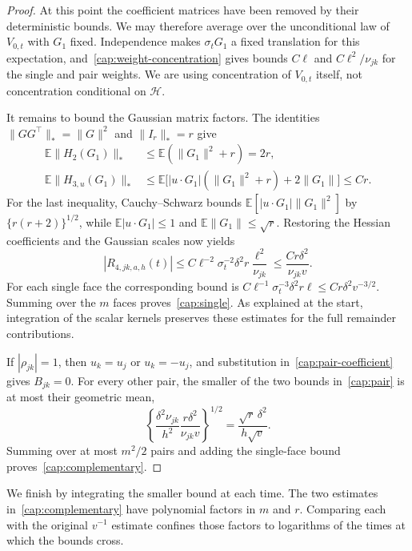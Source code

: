\documentclass[11pt,letterpaper]{article}
\theoremstyle{remark}
\newcommand{\E}{\mathbb E}
\begin{document}
\begin{proof}
At this point the coefficient matrices have been removed by
their deterministic bounds. We may therefore average over
the unconditional law of $V_{0,t}$ with $G_1$ fixed.
Independence makes $\sigma_tG_1$ a fixed translation for this
expectation, and~\eqref{cap:weight-concentration} gives bounds
$C\ell$ and $C\ell^2/\nu_{jk}$ for the single and pair
weights. We are using concentration of $V_{0,t}$ itself,
not concentration conditional on $\mathcal H$.

It remains to bound the Gaussian matrix factors. The identities
$\|GG^\top\|_*=\|G\|^2$ and $\|I_r\|_*=r$ give
\[
 \begin{aligned}
 \E\|H_2(G_1)\|_*&\le\E(\|G_1\|^2+r)=2r,\\
 \E\|H_{3,u}(G_1)\|_*
 &\le\E\bigl[|u\cdot G_1|(\|G_1\|^2+r)
                                      +2\|G_1\|\bigr]\le Cr.
 \end{aligned}
\]
For the last inequality, Cauchy--Schwarz bounds
$\E[|u\cdot G_1|\|G_1\|^2]$ by
$\{r(r+2)\}^{1/2}$, while
$\E|u\cdot G_1|\le1$ and $\E\|G_1\|\le\sqrt r$.
Restoring the Hessian coefficients and the Gaussian scales now
yields
\[
 |R_{4,jk,a,h}(t)|
 \le C\ell^{-2}\sigma_t^{-2}\delta^2r
                    \frac{\ell^2}{\nu_{jk}}
 \le\frac{Cr\delta^2}{\nu_{jk}v}.
\]
For each single face the corresponding bound is
$C\ell^{-1}\sigma_t^{-3}\delta^2r\ell
 \le Cr\delta^2v^{-3/2}$.
Summing over the $m$ faces proves~\eqref{cap:single}.
As explained at the start, integration of the scalar kernels
preserves these estimates for the full remainder contributions.

If $|\rho_{jk}|=1$, then $u_k=u_j$ or $u_k=-u_j$,
and substitution in~\eqref{cap:pair-coefficient} gives
$B_{jk}=0$. For every other pair, the smaller of the two
bounds in~\eqref{cap:pair} is at most their geometric mean,
\[
 \left\{\frac{\delta^2\nu_{jk}}{h^2}
         \frac{r\delta^2}{\nu_{jk}v}\right\}^{1/2}
 =\frac{\sqrt r\,\delta^2}{h\sqrt v}.
\]
Summing over at most $m^2/2$ pairs and adding the single-face
bound proves~\eqref{cap:complementary}.
\end{proof}

We finish by integrating the smaller bound at each time.
The two estimates in~\eqref{cap:complementary} have polynomial
factors in $m$ and $r$. Comparing each with the original
$v^{-1}$ estimate confines those factors to logarithms of
the times at which the bounds cross.
\end{document}

